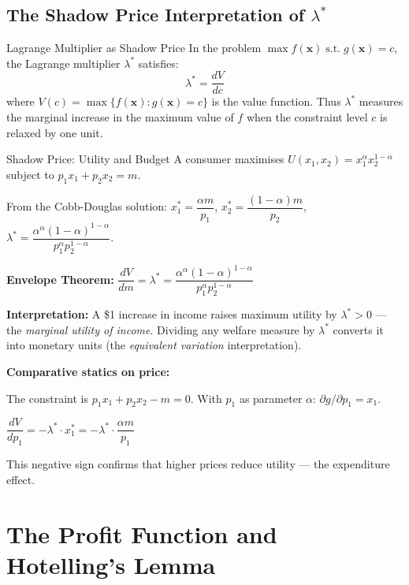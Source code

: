 \documentclass[12pt, a4paper]{article}
\theoremstyle{definition}
\newcommand{\bx}{\mathbf{x}}
\newcommand{\ddd}[2]{\dfrac{d#1}{d#2}}
\newcommand{\st}{\;\text{s.t.}\;}
\begin{document}
\subsection{The Shadow Price Interpretation of $\lambda^*$}

\begin{propbox}{Lagrange Multiplier as Shadow Price}
In the problem $\max f(\bx) \st g(\bx) = c$, the Lagrange multiplier
$\lambda^*$ satisfies:
\[
  \lambda^* = \ddd{V}{c}
\]
where $V(c) = \max\{f(\bx) : g(\bx)=c\}$ is the value function. Thus
$\lambda^*$ measures the marginal increase in the maximum value of $f$ when
the constraint level $c$ is relaxed by one unit.
\end{propbox}

\begin{exbox}{Shadow Price: Utility and Budget}
A consumer maximises $U(x_1,x_2) = x_1^\alpha x_2^{1-\alpha}$ subject to
$p_1 x_1 + p_2 x_2 = m$.

From the Cobb-Douglas solution:
$x_1^* = \dfrac{\alpha m}{p_1}$, \; $x_2^* = \dfrac{(1-\alpha) m}{p_2}$, \;
$\lambda^* = \dfrac{\alpha^\alpha (1-\alpha)^{1-\alpha}}{p_1^\alpha p_2^{1-\alpha}}$.

\textbf{Envelope Theorem:}
$\ddd{V}{m} = \lambda^* = \dfrac{\alpha^\alpha(1-\alpha)^{1-\alpha}}{p_1^\alpha p_2^{1-\alpha}}$

\textbf{Interpretation:} A \$1 increase in income raises maximum utility by
$\lambda^* > 0$ --- the \emph{marginal utility of income}. Dividing any
welfare measure by $\lambda^*$ converts it into monetary units (the
\emph{equivalent variation} interpretation).

\textbf{Comparative statics on price:}

The constraint is $p_1 x_1 + p_2 x_2 - m = 0$. With $p_1$ as parameter
$\alpha$: $\partial g/\partial p_1 = x_1$.

$\ddd{V}{p_1} = -\lambda^*\cdot x_1^* = -\lambda^*\cdot\dfrac{\alpha m}{p_1}$

This negative sign confirms that higher prices reduce utility --- the
expenditure effect.
\end{exbox}

\section{The Profit Function and Hotelling's Lemma}
\end{document}
